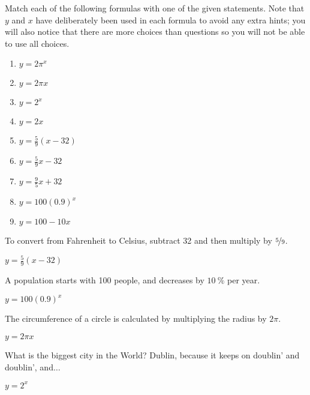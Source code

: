 \begin{exercises}
\begin{problem}
Match each of the following formulas with one of the given statements. 
Note that $y$ and $x$ have deliberately been used in each formula to avoid 
any extra hints; you will also notice that there are more choices than questions so you 
will not be able to use all choices.
\begin{multicols}{4}
	\begin{enumerate}[label=(\roman*)]
		\item $y=2\pi^x$
		\item $y=2\pi x$
		\item $y=2^x$
		\item $y=2x$
		\item $y=\frac{5}{9}\left( x-32 \right)$
		\item $y=\frac{5}{9}x-32 $
		\item $y=\frac{9}{5}x+32$
		\item $y=100(0.9)^x$
		\item $y=100-10x$
	\end{enumerate}
\end{multicols}
\begin{subproblem}
	To convert from Fahrenheit to Celsius, subtract 32 and then multiply by $\nicefrac{5}{9}$.
	\begin{shortsolution}
		$y=\frac{5}{9}\left( x-32 \right)$
	\end{shortsolution}
\end{subproblem}
\begin{subproblem}
	A population starts with 100 people, and decreases by $\SI{10}{\percent}$ per year.
	\begin{shortsolution}
		$y=100(0.9)^x$
	\end{shortsolution}
\end{subproblem}
\begin{subproblem}
	The circumference of a circle is calculated by multiplying the radius by $2\pi$.
	\begin{shortsolution}
		$y=2\pi x$
	\end{shortsolution}
\end{subproblem}
\begin{subproblem}
	What is the biggest city in the World? Dublin, because it keeps on doublin' and doublin', and$\ldots$
	\begin{shortsolution}
		$y=2^x$
	\end{shortsolution}

\end{subproblem}
\end{problem}
\end{exercises}
